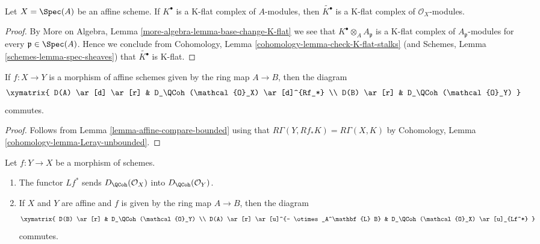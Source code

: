 \begin{lemma}
\label{lemma-affine-K-flat}
Let $X = \Spec(A)$ be an affine scheme. If $K^\bullet$ is a K-flat
complex of $A$-modules, then $\widetilde{K^\bullet}$ is a K-flat
complex of $\mathcal{O}_X$-modules.
\end{lemma}

\begin{proof}
By More on Algebra, Lemma \ref{more-algebra-lemma-base-change-K-flat}
we see that $K^\bullet \otimes_A A_\mathfrak p$ is a K-flat complex
of $A_\mathfrak p$-modules for every $\mathfrak p \in \Spec(A)$.
Hence we conclude from
Cohomology, Lemma \ref{cohomology-lemma-check-K-flat-stalks}
(and
Schemes, Lemma \ref{schemes-lemma-spec-sheaves})
that $\widetilde{K^\bullet}$ is K-flat.
\end{proof}

\begin{lemma}
\label{lemma-quasi-coherence-pushforward}
If $f : X \to Y$ is a morphism of affine schemes given by the ring map
$A \to B$, then the diagram
$$
\xymatrix{
D(A) \ar[d] \ar[r] & D_\QCoh(\mathcal{O}_X) \ar[d]^{Rf_*} \\
D(B) \ar[r] & D_\QCoh(\mathcal{O}_Y)
}
$$
commutes.
\end{lemma}

\begin{proof}
Follows from Lemma \ref{lemma-affine-compare-bounded}
using that $R\Gamma(Y, Rf_*K) = R\Gamma(X, K)$ by
Cohomology, Lemma \ref{cohomology-lemma-Leray-unbounded}.
\end{proof}

\begin{lemma}
\label{lemma-quasi-coherence-pullback}
Let $f : Y \to X$ be a morphism of schemes.
\begin{enumerate}
\item The functor $Lf^*$ sends $D_\QCoh(\mathcal{O}_X)$
into $D_\QCoh(\mathcal{O}_Y)$.
\item If $X$ and $Y$ are affine and $f$ is given by the ring map
$A \to B$, then the diagram
$$
\xymatrix{
D(B) \ar[r] & D_\QCoh(\mathcal{O}_Y) \\
D(A) \ar[r] \ar[u]^{- \otimes_A^\mathbf{L} B} &
D_\QCoh(\mathcal{O}_X) \ar[u]_{Lf^*}
}
$$
commutes.
\end{enumerate}
\end{lemma}


